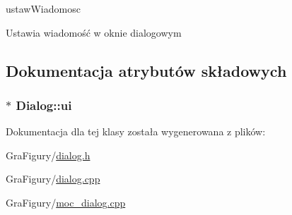 ustaw\-Wiadomosc 

Ustawia wiadomość w oknie dialogowym 

\subsection{Dokumentacja atrybutów składowych}
\hypertarget{classDialog_aaa4b5bfb9a0f64900d524f14bc32e6df}{
\subsubsection[{ui}]{$\ast$ Dialog\-::ui\hspace{0.3cm}{\ttfamily [private]}}}\label{classDialog_aaa4b5bfb9a0f64900d524f14bc32e6df}


Dokumentacja dla tej klasy została wygenerowana z plików\-:\begin{DoxyCompactItemize}
\item 
Gra\-Figury/\hyperlink{dialog_8h}{dialog.\-h}\item 
Gra\-Figury/\hyperlink{dialog_8cpp}{dialog.\-cpp}\item 
Gra\-Figury/\hyperlink{moc__dialog_8cpp}{moc\-\_\-dialog.\-cpp}\end{DoxyCompactItemize}
